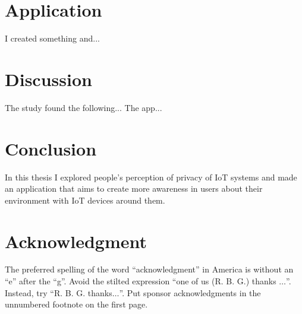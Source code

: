 \documentclass[conference]{IEEEtran}
\begin{document}
\section{Application}

I created something and...

\section{Discussion}

The study found the following... The app...

\section{Conclusion}

In this thesis I explored people's perception of privacy of IoT systems and
made an application that aims to create more awareness in users about their
environment with IoT devices around them.

\section*{Acknowledgment}

The preferred spelling of the word ``acknowledgment'' in America is without
an ``e'' after the ``g''. Avoid the stilted expression ``one of us (R. B.
G.) thanks $\ldots$''. Instead, try ``R. B. G. thanks$\ldots$''. Put sponsor
acknowledgments in the unnumbered footnote on the first page.



\end{document}
